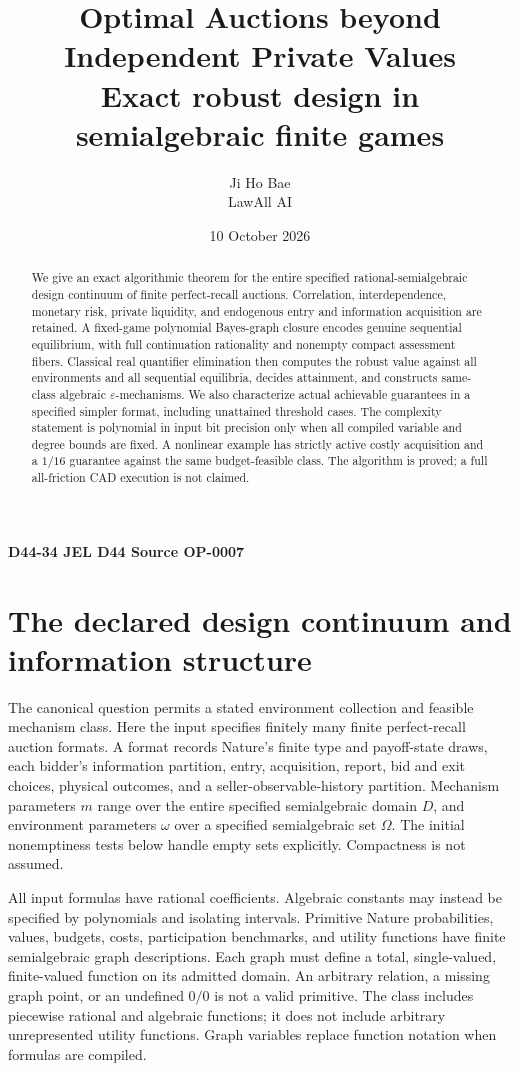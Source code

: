 \documentclass[11pt,a4paper]{article}
\title{Optimal Auctions beyond Independent Private Values\\[4pt]
 \large Exact robust design in semialgebraic finite games}
\author{Ji Ho Bae\\\small LawAll AI}
\date{10 October 2026}
\numberwithin{equation}{section}
\theoremstyle{definition}
\begin{document}
\maketitle
\begin{center}
\small\textbf{D44-34 \quad JEL D44 \quad Source OP-0007}
\end{center}
\begin{abstract}
We give an exact algorithmic theorem for the entire specified
rational-semialgebraic design continuum of finite perfect-recall auctions.
Correlation, interdependence, monetary risk, private liquidity, and
endogenous entry and information acquisition are retained.
A fixed-game polynomial Bayes-graph closure encodes genuine sequential
equilibrium, with full continuation rationality and nonempty compact
assessment fibers. Classical real quantifier elimination then computes
the robust value against all environments and all sequential equilibria,
decides attainment, and constructs same-class algebraic
\(\varepsilon\)-mechanisms. We also characterize actual achievable
guarantees in a specified simpler format, including unattained threshold
cases. The complexity statement is polynomial in input bit precision
only when all compiled variable and degree bounds are fixed.
A nonlinear example has strictly active costly acquisition and a
\(1/16\) guarantee against the same budget-feasible class.
The algorithm is proved; a full all-friction CAD execution is not claimed.
\end{abstract}

\section{The declared design continuum and information structure}\label{sec:model}
The canonical question permits a stated environment collection
and feasible mechanism class. Here the input specifies finitely many
finite perfect-recall auction formats. A format records Nature's finite
type and payoff-state draws, each bidder's information partition,
entry, acquisition, report, bid and exit choices, physical outcomes,
and a seller-observable-history partition.
Mechanism parameters \(m\) range over the entire specified
semialgebraic domain \(D\), and environment parameters \(\omega\) over
a specified semialgebraic set \(\Omega\).
The initial nonemptiness tests below handle empty sets explicitly.
Compactness is not assumed.

All input formulas have rational coefficients.
Algebraic constants may instead be specified by polynomials and
isolating intervals.
Primitive Nature probabilities, values, budgets, costs, participation
benchmarks, and utility functions have finite semialgebraic graph
descriptions. Each graph must define a total, single-valued,
finite-valued function on its admitted domain.
An arbitrary relation, a missing graph point, or an undefined
\(0/0\) is not a valid primitive.
The class includes piecewise rational and algebraic functions; it does
not include arbitrary unrepresented utility functions.
Graph variables replace function notation when formulas are compiled.
\end{document}

